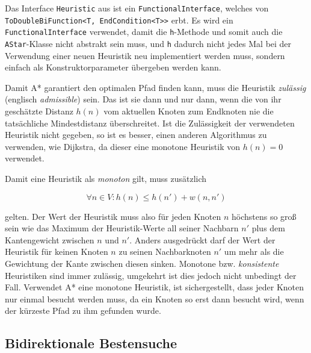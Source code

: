                 
                
                Das Interface \lstinline{Heuristic} aus  ist ein \lstinline{FunctionalInterface}, welches von \lstinline{ToDoubleBiFunction<T, EndCondition<T>>} erbt. Es wird ein \lstinline{FunctionalInterface} verwendet, damit die \lstinline{h}-Methode und somit auch die \lstinline{AStar}-Klasse nicht abstrakt sein muss, und \lstinline{h} dadurch nicht jedes Mal bei der Verwendung einer neuen Heuristik neu implementiert werden muss, sondern einfach als Konstruktorparameter übergeben werden kann. \cite{EZ:Web08, EZ:Web18}
                
                

                Damit A* garantiert den optimalen Pfad finden kann, muss die Heuristik \emph{zulässig} (englisch \emph{admissible}) sein. Das ist sie dann und nur dann, wenn die von ihr geschätzte Distanz $h(n)$ vom aktuellen Knoten zum Endknoten nie die tatsächliche Mindestdistanz überschreitet. Ist die Zulässigkeit der verwendeten Heuristik nicht gegeben, so ist es besser, einen anderen Algorithmus zu verwenden, wie \zb Dijkstra, da dieser eine monotone Heuristik von $h(n) = 0$ verwendet.
                
                Damit eine Heuristik als \emph{monoton} gilt, muss zusätzlich
                
                    \[\forall n \in V: h(n) \leq h(n') + w(n, n')\]
                
                gelten. Der Wert der Heuristik muss also für jeden Knoten $n$ höchstens so groß sein wie das Maximum der Heuristik-Werte all seiner Nachbarn $n'$ plus dem Kantengewicht zwischen $n$ und $n'$. Anders ausgedrückt darf der Wert der Heuristik für keinen Knoten $n$ zu seinen Nachbarknoten $n'$ um mehr als die Gewichtung der Kante zwischen diesen sinken. Monotone bzw. \emph{konsistente} Heuristiken sind immer zulässig, umgekehrt ist dies jedoch nicht unbedingt der Fall. Verwendet A* eine monotone Heuristik, ist sichergestellt, dass jeder Knoten nur einmal besucht werden muss, da ein Knoten so erst dann besucht wird, wenn der kürzeste Pfad zu ihm gefunden wurde. \cite{EZ:Web18, EZ:Web57}

        \subsection{Bidirektionale Bestensuche} \label{bidi-befs}
        
